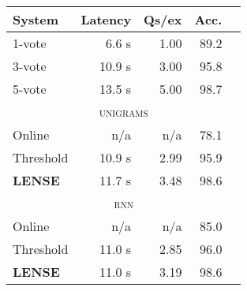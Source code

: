 \begin{tabular}[b]{l  r  r  r  r}
    \textbf{System} & \textbf{Latency} & \textbf{Qs/ex} & \textbf{Acc.} \\ \hline
    1-vote & 6.6 s & 1.00 & 89.2 \\ %
    3-vote & 10.9 s & 3.00 & 95.8 \\ %
    5-vote & 13.5 s & 5.00 & 98.7 \\ %
    \multicolumn{5}{c}{\textsc{unigrams}} \\ \hline
    Online & n/a & n/a & 78.1 \\ %
    Threshold & 10.9 s & 2.99 & 95.9 \\ %
    \textbf{LENSE} & 11.7 s & 3.48 & 98.6 \\ %
    \multicolumn{5}{c}{\textsc{rnn}} \\ \hline
    Online & n/a & n/a & 85.0 \\ %
    Threshold & 11.0 s & 2.85 & 96.0 \\ %
    \textbf{LENSE} & 11.0 s & 3.19 & 98.6 \\%
\end{tabular}
